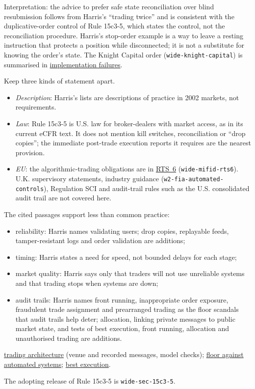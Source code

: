 \begin{qfmethod}
 Interpretation: the advice to prefer safe state reconciliation over blind resubmission follows from Harris's ``trading twice'' and is consistent with the duplicative-order control of Rule 15c3-5, which states the control, not the reconciliation procedure. Harris's stop-order example is a way to leave a resting instruction that protects a position while disconnected; it is not a substitute for knowing the order's state. The Knight Capital order (\nolinkurl{wide-knight-capital}) is summarised in \hyperref[ev:quant-implementation-failures]{implementation failures}.

 Keep three kinds of statement apart.
\begin{itemize}
\item \emph{Description}: Harris's lists are descriptions of practice in 2002 markets, not requirements.
\item \emph{Law}: Rule 15c3-5 is U.S. law for broker-dealers with market access, as in its current eCFR text. It does not mention kill switches, reconciliation or ``drop copies''; the immediate post-trade execution reports it requires are the nearest provision.
\item \emph{EU}: the algorithmic-trading obligations are in \hyperref[rule:mifid-rts6-algorithmic-controls]{RTS~6} (\nolinkurl{wide-mifid-rts6}). U.K. supervisory statements, industry guidance (\nolinkurl{w2-fia-automated-controls}), Regulation SCI and audit-trail rules such as the U.S. consolidated audit trail are not covered here.
\end{itemize}
The cited passages support less than common practice:
\begin{itemize}
\item reliability: Harris names validating users; drop copies, replayable feeds, tamper-resistant logs and order validation are additions;
\item timing: Harris states a need for speed, not bounded delays for each stage;
\item market quality: Harris says only that traders will not use unreliable systems and that trading stops when systems are down;
\item audit trails: Harris names front running, inappropriate order exposure, fraudulent trade assignment and prearranged trading as the floor scandals that audit trails help deter; allocation, linking private messages to public market state, and tests of best execution, front running, allocation and unauthorised trading are additions.
\end{itemize}

 \hyperref[def:automated-trading-architecture]{trading architecture} (venue and recorded messages, model checks); \hyperref[def:floor-automated-trading-systems]{floor against automated systems}; \hyperref[def:best-execution]{best execution}.

 The adopting release of Rule 15c3-5 is \nolinkurl{wide-sec-15c3-5}.

\end{qfmethod}

